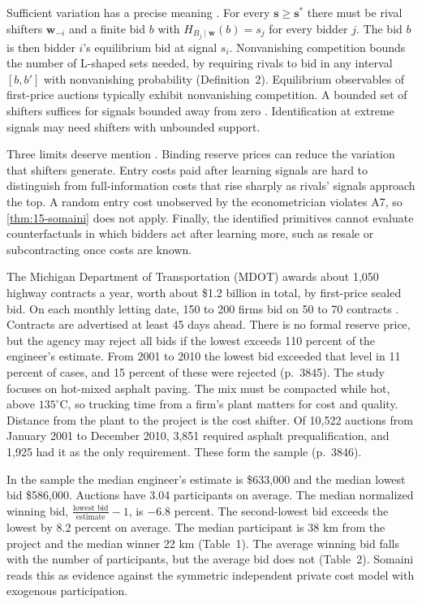 Sufficient variation has a precise meaning \citep[Definition~1]{Somaini2020}. For every $\bm s\ge\bm s^\ast$
there must be rival shifters $\bm w_{-i}$ and a finite bid $b$ with $H_{B_j\mid\bm w}(b)=s_j$ for every bidder
$j$. The bid $b$ is then bidder $i$'s equilibrium bid at signal $s_i$. Nonvanishing competition bounds the number of L-shaped sets
needed, by requiring rivals to bid in any interval $[b,b']$ with nonvanishing probability (Definition~2).
Equilibrium observables of first-price auctions typically exhibit nonvanishing competition. A bounded set of
shifters suffices for signals bounded away from zero \citep[Propositions~5--6]{Somaini2020}. Identification at
extreme signals may need shifters with unbounded support.

Three limits deserve mention \citep[Section~III.C]{Somaini2020}. Binding reserve prices can reduce the variation
that shifters generate. Entry costs paid after learning signals are hard to distinguish from full-information
costs that rise sharply as rivals' signals approach the top. A random entry cost unobserved by the econometrician
violates A7, so \cref{thm:15-somaini} does not apply. Finally, the identified primitives cannot evaluate
counterfactuals in which bidders act after learning more, such as resale or subcontracting once costs are known.

 The Michigan Department of Transportation (MDOT) awards about 1,050 highway contracts
a year, worth about \$1.2 billion in total, by first-price sealed bid. On each monthly letting date, 150 to 200
firms bid on 50 to 70 contracts \citep[p.~3844]{Somaini2020}. Contracts are advertised at least 45 days ahead.
There is no formal reserve price, but the agency may reject all bids if the lowest exceeds 110 percent of the
engineer's estimate. From 2001 to 2010 the lowest bid exceeded that level in 11 percent of cases, and 15 percent
of these were rejected (p.~3845). The study focuses on hot-mixed asphalt paving. The mix must be compacted while
hot, above $135^\circ$C, so trucking time from a firm's plant matters for cost and quality. Distance from the plant
to the project is the cost shifter. Of 10,522 auctions from January 2001 to December 2010, 3,851 required asphalt
prequalification, and 1,925 had it as the only requirement. These form the sample (p.~3846).

In the sample the median engineer's estimate is \$633,000 and the median lowest bid \$586,000. Auctions have 3.04
participants on average. The median normalized winning bid, $\frac{\text{lowest bid}}{\text{estimate}}-1$, is
$-6.8$ percent. The second-lowest bid exceeds the lowest by 8.2 percent on average. The median participant is 38
km from the project and the median winner 22 km (Table~1). The average winning bid falls with the number of
participants, but the average bid does not (Table~2). Somaini reads this as evidence against the symmetric
independent private cost model with exogenous participation.


